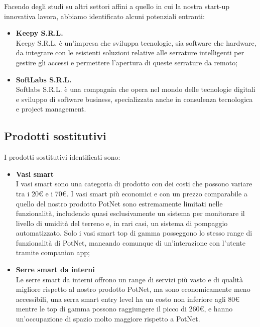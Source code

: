 Facendo degli studi su altri settori affini a quello in cui la nostra start-up innovativa lavora, abbiamo identificato alcuni potenziali entranti:
\begin{itemize}
	\item \textbf{Keepy S.R.L.}\\
	Keepy S.R.L. è un’impresa che sviluppa tecnologie, sia software che hardware, da integrare con le esistenti soluzioni relative alle serrature intelligenti per gestire gli accessi e permettere l’apertura di queste serrature da remoto;
	\item \textbf{SoftLabs S.R.L.}\\
	Softlabs S.R.L. è una compagnia che opera nel mondo delle tecnologie digitali e sviluppo di software business, specializzata anche in consulenza tecnologica e project management. 
\end{itemize}

\subsection{Prodotti sostitutivi}
I prodotti sostitutivi identificati sono:
\begin{itemize}
	\item \textbf{Vasi smart}\\
	I vasi smart sono una categoria di prodotto con dei costi che possono variare tra i 20€ e i 70€. I vasi smart più economici e con un prezzo comparabile a quello del nostro prodotto PotNet sono estremamente limitati nelle funzionalità, includendo quasi esclusivamente un sistema per monitorare il livello di umidità del terreno e, in rari casi, un sistema di pompaggio automatizzato. Solo i vasi smart top di gamma posseggono lo stesso range di funzionalità di PotNet, mancando comunque di un’interazione con l’utente tramite companion app;
	\item \textbf{Serre smart da interni}\\
	Le serre smart da interni offrono un range di servizi più vasto e di qualità migliore rispetto al nostro prodotto PotNet, ma sono economicamente meno accessibili, una serra smart entry level ha un costo non inferiore agli 80€ mentre le top di gamma possono raggiungere il picco di 260€, e hanno un’occupazione di spazio molto maggiore rispetto a PotNet.
\end{itemize}

